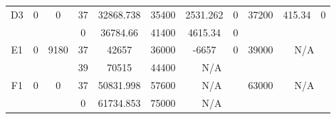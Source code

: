 \begin{sidewaystable}
\begin{tabular}{c||c|c||c|c|c|c|c||c|c|c}
         &
        
      \\
      \hline
      \multirow{2}{*}{D3} &
      \multirow{2}{*}{0} &
      \multirow{2}{*}{0} &
      37 &
      32868.738 &
      35400 &
        2531.262 &
        0 &
      \multirow{2}{*}{37200} &
        \multirow{2}{*}{415.34} &
        \multirow{2}{*}{0}
      \\
      \cline{4-8}
       &
       &
       &
      0 &
      36784.66 &
      41400 &
        4615.34 &
        0 &
      
         &
        
      \\
      \hline
      \multirow{2}{*}{E1} &
      \multirow{2}{*}{0} &
      \multirow{2}{*}{9180} &
      37 &
      42657 &
      36000 &
        -6657 &
        0 &
      \multirow{2}{*}{39000} &
        \multicolumn{2}{c}{\multirow{2}{*}{N/A}}
      \\
      \cline{4-8}
       &
       &
       &
      39 &
      70515 &
      44400 &
        \multicolumn{2}{|c||}{N/A} &
      
        
      \\
      \hline
      \multirow{2}{*}{F1} &
      \multirow{2}{*}{0} &
      \multirow{2}{*}{0} &
      37 &
      50831.998 &
      57600 &
        \multicolumn{2}{|c||}{N/A} &
      \multirow{2}{*}{63000} &
        \multicolumn{2}{c}{\multirow{2}{*}{N/A}}
      \\
      \cline{4-8}
       &
       &
       &
      0 &
      61734.853 &
      75000 &
        \multicolumn{2}{|c||}{N/A} &
      
        
      \\
\end{tabular}
\label{table:RDS1-1435.tex} 
\end{sidewaystable}